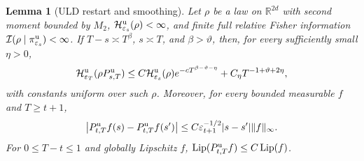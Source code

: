 \documentclass[11pt]{article}
\newtheorem{lemma}[theorem]{Lemma}
\theoremstyle{definition}
\newcommand{\R}{\mathbb R}
\newcommand{\cH}{\mathcal H}
\newcommand{\cI}{\mathcal I}
\newcommand{\eps}{\varepsilon}
\begin{document}
\begin{lemma}[ULD restart and smoothing]\label{lem:uldrestart}
Let $\rho$ be a law on $\R^{2d}$ with second moment bounded by $M_2$,
$\cH^{\rm u}_{\eps_s}(\rho)<\infty$, and finite full relative Fisher
information $\cI(\rho\mid\pi^{\rm u}_{\eps_s})<\infty$. If
$T-s\asymp T^\beta$, $s\asymp T$, and
$\beta>\vartheta$, then, for every sufficiently small $\eta>0$,
\begin{equation}\label{eq:uldrestart}
 \cH^{\rm u}_{\eps_T}(\rho P^{\rm u}_{s,T})
 \leq C\cH^{\rm u}_{\eps_s}(\rho)
          e^{-cT^{\beta-\vartheta-\eta}}
       +C_\eta T^{-1+\vartheta+2\eta},
\end{equation}
with constants uniform over such $\rho$. Moreover, for every bounded
measurable $f$ and $T\geq t+1$,
\begin{equation}\label{eq:uldsmoothing}
 \left|P^{\rm u}_{t,T}f(s)-P^{\rm u}_{t,T}f(s')\right|
 \leq C\eps_{t+1}^{-1/2}|s-s'|\|f\|_\infty.
\end{equation}
For $0\leq T-t\leq1$ and globally Lipschitz $f$,
$\operatorname{Lip}(P^{\rm u}_{t,T}f)\leq C\operatorname{Lip}(f)$.
\end{lemma}
\end{document}
